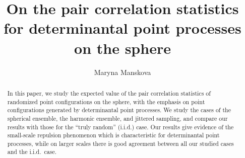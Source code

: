 \documentclass[a4paper,11pt]{amsart}
\begin{document}
\title{On the pair correlation statistics for determinantal point processes on the sphere}

\author{Maryna Manskova}

\address{Graz University of Technology, Institute of Analysis and Number Theory, Steyrergasse 30/II, 8010 Graz, Austria}







\begin{abstract} 
In this paper, we study the expected value of the pair correlation statistics of randomized point configurations on the sphere, with the emphasis on point configurations generated by determinantal point processes. We study the cases of the spherical ensemble, the harmonic ensemble, and jittered sampling, and compare our results with those for the ``truly random'' (i.i.d.) case. Our results give evidence of the small-scale repulsion phenomenon which is characteristic for determinantal point processes, while on larger scales there is good agreement between all our studied cases and the i.i.d.\  case.
\end{abstract}
	

\maketitle
\end{document}
